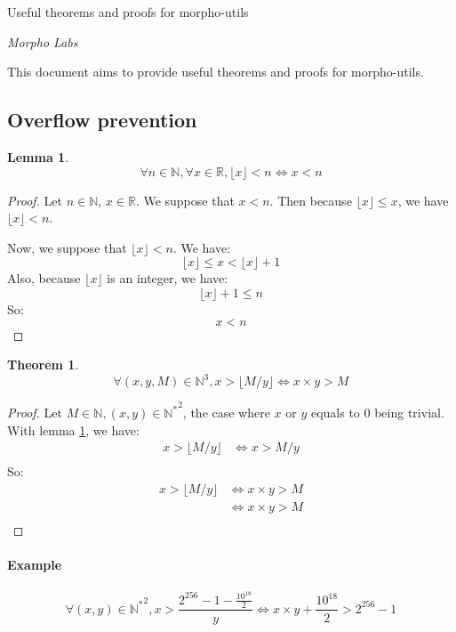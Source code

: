 \documentclass[12pt]{article}
\newtheorem{theorem}{Theorem}
\newtheorem{lemma}{Lemma}
\begin{document}
\begin{center}
    \Large Useful theorems and proofs for morpho-utils
    \vspace{1\baselineskip}

    \normalsize \textit{Morpho Labs}
\end{center}

\vspace{2\baselineskip}

This document aims to provide useful theorems and proofs for morpho-utils.

\subsection*{Overflow prevention}

\begin{lemma} \label{lemma-1}
    \[\forall n\in\mathbb{N}, \forall x\in\mathbb{R}, \lfloor x\rfloor<n \Leftrightarrow x<n\]
\end{lemma}

\begin{proof}
    Let $n\in\mathbb{N}$, $x\in\mathbb{R}$.
    We suppose that $x<n$. Then because $\lfloor x\rfloor\leq x$, we have $\lfloor x\rfloor<n$.
    
    Now, we suppose that $\lfloor x\rfloor<n$. We have:
    \[\lfloor x\rfloor\leq x<\lfloor x\rfloor+1\]
    Also, because $\lfloor x\rfloor$ is an integer, we have:
    \[\lfloor x\rfloor+1\leq n\]
    So:
    \[x<n\]
\end{proof}    

\begin{theorem}
    \[\forall(x,y, M)\in\mathbb{N}^3, x>\lfloor M/y \rfloor \Leftrightarrow x\times y>M\]
\end{theorem}

\begin{proof}
    Let $M\in\mathbb{N}, (x, y)\in{\mathbb{N}^*}^2$, the case where $x$ or $y$ equals to 0 being trivial. 
    With lemma \ref{lemma-1}, we have:
    \begin{align*}
        x > \lfloor M/y \rfloor &\Leftrightarrow x > M/y \\
    \end{align*}
    So:
    \begin{align*}
        x > \lfloor M/y \rfloor &\Leftrightarrow x \times y > M\\
        &\Leftrightarrow x \times y > M\\
    \end{align*}
\end{proof}

\paragraph{Example}

\[\forall(x,y)\in{\mathbb{N}^*}^2, x>\frac{2^{256}-1-\frac{10^{18}}{2}}{y} \Leftrightarrow x \times y + \frac{10^{18}}{2} > 2^{256}-1\]
\end{document}

